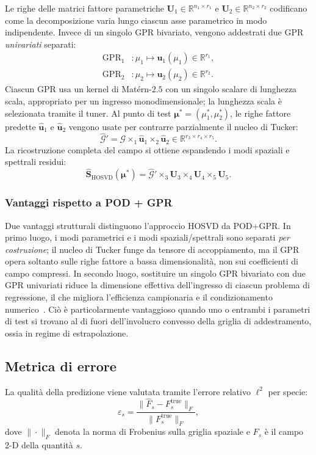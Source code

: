 Le righe delle matrici fattore parametriche $\mathbf{U}_1 \in \mathbb{R}^{n_1 \times r_1}$ e $\mathbf{U}_2 \in \mathbb{R}^{n_2 \times r_2}$ codificano come la decomposizione varia lungo ciascun asse parametrico in modo indipendente. Invece di un singolo GPR bivariato, vengono addestrati due GPR \emph{univariati} separati:
\begin{align}
    \mathrm{GPR}_1 &: \mu_1 \mapsto \mathbf{u}_1(\mu_1) \in \mathbb{R}^{r_1}, \\
    \mathrm{GPR}_2 &: \mu_2 \mapsto \mathbf{u}_2(\mu_2) \in \mathbb{R}^{r_2}.
\end{align}
Ciascun GPR usa un kernel di Matérn-$2.5$ con un singolo scalare di lunghezza scala, appropriato per un ingresso monodimensionale; la lunghezza scala è selezionata tramite il tuner. Al punto di test $\boldsymbol{\mu}^* = (\mu_1^*, \mu_2^*)$, le righe fattore predette $\hat{\mathbf{u}}_1$ e $\hat{\mathbf{u}}_2$ vengono usate per contrarre parzialmente il nucleo di Tucker:
\begin{equation}
    \hat{\mathcal{G}}' = \mathcal{G} \times_1 \hat{\mathbf{u}}_1 \times_2 \hat{\mathbf{u}}_2
    \in \mathbb{R}^{r_3 \times r_4 \times r_5}.
\end{equation}
La ricostruzione completa del campo si ottiene espandendo i modi spaziali e spettrali residui:
\begin{equation}
    \hat{\mathbf{S}}_{\mathrm{HOSVD}}(\boldsymbol{\mu}^*) = \hat{\mathcal{G}}' \times_3 \mathbf{U}_3 \times_4 \mathbf{U}_4 \times_5 \mathbf{U}_5.
\end{equation}

\subsubsection{Vantaggi rispetto a POD + GPR}

Due vantaggi strutturali distinguono l'approccio HOSVD da POD+GPR.
In primo luogo, i modi parametrici e i modi spaziali/spettrali sono separati \emph{per costruzione}; il nucleo di Tucker funge da tensore di accoppiamento, ma il GPR opera soltanto sulle righe fattore a bassa dimensionalità, non sui coefficienti di campo compressi.
In secondo luogo, sostituire un singolo GPR bivariato con due GPR univariati riduce la dimensione effettiva dell'ingresso di ciascun problema di regressione, il che migliora l'efficienza campionaria e il condizionamento numerico~\cite{williams1995gaussian}. Ciò è particolarmente vantaggioso quando uno o entrambi i parametri di test si trovano al di fuori dell'involucro convesso della griglia di addestramento, ossia in regime di estrapolazione.

\subsection{Metrica di errore}

La qualità della predizione viene valutata tramite l'errore relativo $\ell^2$ per specie:
\begin{equation}
    \varepsilon_s = \frac{\|\hat{F}_s - F_s^{\mathrm{true}}\|_F}{\|F_s^{\mathrm{true}}\|_F},
\end{equation}
dove $\|\cdot\|_F$ denota la norma di Frobenius sulla griglia spaziale e $F_s$ è il campo 2-D della quantità $s$.
